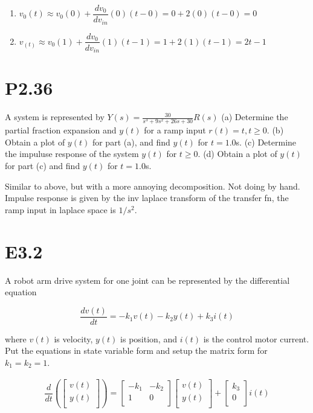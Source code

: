 \documentclass[11pt]{article}
\begin{document}
\begin{enumerate}
    \item $v_0(t) \approx v_0(0) + \dfrac{dv_0}{dv_{in}} (0) (t - 0) = 0 + 2(0)(t - 0) = 0$
    \item $v_(t) \approx v_0(1) + \dfrac{dv_0}{dv_{in}} (1) (t - 1) = 1 + 2(1) (t - 1) = 2t - 1$ 
\end{enumerate}

\section{P2.36}

A system is represented by $Y(s) = \frac{30}{s^3 + 9s^2 + 26s + 30} R(s)$ (a) Determine the partial fraction expansion and $y(t)$ for a ramp input $r(t) = t, t \geq 0$. (b) Obtain a plot of $y(t)$ for part (a), and find $y(t)$ for $t = 1.0$s. (c) Determine the impuluse response of the system $y(t)$ for $t \geq 0$. (d) Obtain a plot of $y(t)$ for part (c) and find $y(t)$ for $t = 1.0$s.

Similar to above, but with a more annoying decomposition. Not doing by hand. Impulse response is given by the inv laplace transform of the transfer fn, the ramp input in laplace space is $1/s^2$.

\section{E3.2}

A robot arm drive system for one joint can be represented by the differential equation

\[ \dfrac{dv(t)}{dt} = -k_1 v(t) - k_2 y(t) + k_3 i(t) \]

where $v(t)$ is velocity, $y(t)$ is position, and $i(t)$ is the control motor current. Put the equations in state variable form and setup the matrix form for $k_1 = k_2 = 1$.

\begin{align*}
    \dfrac{d}{dt} \left(
        \begin{bmatrix}
            v(t) \\
            y(t) \\
        \end{bmatrix}
    \right)
    =
    \begin{bmatrix}
        -k_1 & -k_2 \\
        1 & 0 \\
    \end{bmatrix}
    \begin{bmatrix}
        v(t) \\
        y(t) \\
    \end{bmatrix}
    +
    \begin{bmatrix}
        k_3 \\
        0 \\
    \end{bmatrix}
    i(t)
\end{align*}
\end{document}
